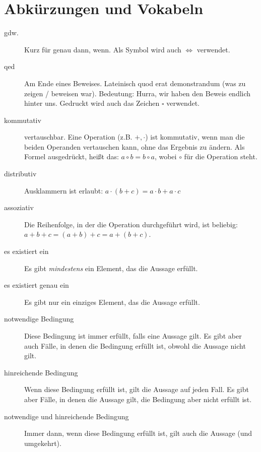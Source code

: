 \section{Abkürzungen und Vokabeln}
\begin{description}
 \item[gdw.] Kurz für \glqq genau dann, wenn\grqq. Als Symbol wird auch
$\Leftrightarrow$ verwendet.
 \item[qed] Am Ende eines Beweises. Lateinisch \glqq quod erat
demonstrandum\grqq{} (\glqq was zu zeigen / beweisen war\grqq). Bedeutung:
Hurra, wir haben den Beweis endlich hinter uns. Gedruckt wird auch
das Zeichen $\square$ verwendet.
 \item[kommutativ] \glqq vertauschbar\grqq. Eine Operation (z.B. $+,\cdot$)
ist kommutativ, wenn man die beiden Operanden vertauschen kann, ohne das
Ergebnis zu ändern. Als Formel ausgedrückt, heißt das: $a\circ b = b\circ a$,
wobei $\circ$ für die Operation steht.
 \item[distributiv] Ausklammern ist erlaubt: $a\cdot(b+c) = a\cdot b + a\cdot
c$
 \item[assoziativ] Die Reihenfolge, in der die Operation durchgeführt wird,
ist beliebig: $a+b+c = (a+b)+c = a+(b+c)$.
 \item[es existiert ein] Es gibt \emph{mindestens} ein Element, das die
Aussage erfüllt.
 \item[es existiert genau ein] Es gibt nur ein einziges Element, das die
Aussage erfüllt.
 \item[notwendige Bedingung] Diese Bedingung ist immer erfüllt, falls eine Aussage gilt. Es gibt aber auch Fälle, in denen die Bedingung erfüllt ist, obwohl die Aussage nicht gilt.
 \item[hinreichende Bedingung] Wenn diese Bedingung erfüllt ist, gilt die Aussage auf jeden Fall. Es gibt aber Fälle, in denen die Aussage gilt, die Bedingung aber nicht erfüllt ist.
 \item[notwendige und hinreichende Bedingung] Immer dann, wenn diese Bedingung erfüllt ist, gilt auch die Aussage (und umgekehrt).
\end{description}





